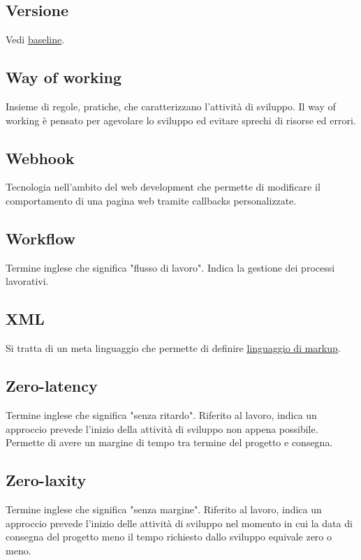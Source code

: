 	
	\subsection{Versione}
	\label{sec:versione}
	Vedi \underline{\hyperref[sec:baseline]{baseline}}.
	
	
	\newpage
	
	
	\subsection{Way of working}
	\label{sec:wow}
	Insieme di regole, pratiche, che caratterizzano l'attività di sviluppo. Il way of working è pensato per agevolare lo sviluppo ed evitare sprechi di risorse ed errori.

	
	\subsection{Webhook}
	\label{sec:webhook}
	Tecnologia nell'ambito del web development che permette di modificare il comportamento di una pagina web tramite callbacks personalizzate.


	\subsection{Workflow}
	\label{sec:workflow}
	Termine inglese che significa "flusso di lavoro". Indica la gestione dei processi lavorativi.

	 
	\newpage


	\subsection{XML}
	\label{sec:xml}
	Si tratta di un meta linguaggio che permette di definire \underline{\hyperref[sec:linguaggiomarkup]{linguaggio di markup}}.
	
	
	\newpage

	
	\subsection{Zero-latency}
	\label{sec:zerolatency}
	Termine inglese che significa "senza ritardo". Riferito al lavoro, indica un approccio prevede l'inizio della attività di sviluppo non appena possibile. Permette di avere un margine di tempo tra termine del progetto e consegna.

	
	\subsection{Zero-laxity}
	\label{sec:zerolaxity}
	Termine inglese che significa "senza margine". Riferito al lavoro, indica un approccio prevede l'inizio delle attività di sviluppo nel momento in cui la data di consegna del progetto meno il tempo richiesto dallo sviluppo equivale zero o meno.



